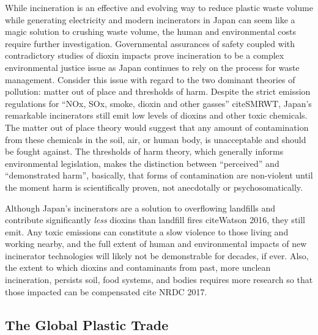 \documentclass{book}\usepackage{knitr}
\begin{document}
While incineration is an effective and evolving way to reduce plastic waste volume while generating electricity and modern incinerators in Japan can seem like a magic solution to crushing waste volume,  the human and environmental costs require further investigation. Governmental assurances of safety coupled with contradictory studies of dioxin impacts prove incineration to be a complex environmental justice issue as Japan continues to rely on the process for waste management. Consider this issue with regard to the two dominant theories of pollution: matter out of place and thresholds of harm. Despite the strict emission regulations for ``NOx, SOx, smoke, dioxin and other gasses'' citeSMRWT, Japan's remarkable incinerators still emit low levels of dioxins and other toxic chemicals. The matter out of place theory would suggest that any amount of contamination from these chemicals in the soil, air, or human body, is unacceptable and should be fought against. The thresholds of harm theory, which generally informs environmental legislation, makes the distinction between ``perceived'' and ``demonstrated harm'', basically, that forms of contamination are non-violent until the moment harm is scientifically proven, not anecdotally or psychosomatically. 

Although Japan's incinerators are a solution to overflowing landfills and contribute significantly \emph{less} dioxins than landfill fires citeWatson 2016, they still emit. Any toxic emissions can constitute a slow violence to those living and working nearby, and the full extent of human and environmental impacts of new incinerator technologies will likely not be demonstrable for decades, if ever. Also, the extent to which dioxins and contaminants from past, more unclean incineration, persists soil, food systems, and bodies requires more research so that those impacted can be compensated cite NRDC 2017. 

\subsection{The Global Plastic Trade}
\end{document}

